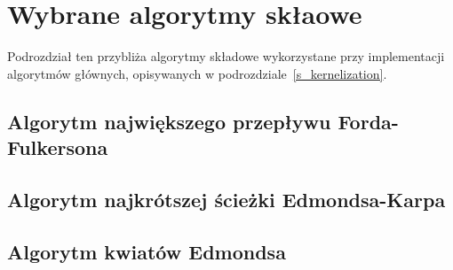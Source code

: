\section{Wybrane algorytmy skłaowe}\label{s_supplementary_algorithms}
\par{
  Podrozdział ten przybliża algorytmy składowe wykorzystane przy implementacji algorytmów
  głównych, opisywanych w podrozdziale~\ref{s_kernelization}.
}

\subsection{Algorytm największego przepływu Forda-Fulkersona}\label{ss_ford_fulkerson}
\subsection{Algorytm najkrótszej ścieżki Edmondsa-Karpa}\label{ss_edmonds_karp}
\subsection{Algorytm kwiatów Edmondsa}\label{ss_edmonds}




